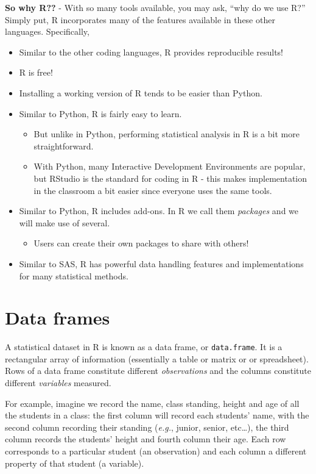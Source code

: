 \documentclass[
]{book}
\providecommand{\tightlist}{%
  \setlength{\itemsep}{0pt}\setlength{\parskip}{0pt}}
\begin{document}
\textbf{So why R??} - With so many tools available, you may ask, ``why do we use R?'' Simply put, R incorporates many of the features available in these other languages. Specifically,

\begin{itemize}
\tightlist
\item
  Similar to the other coding languages, R provides reproducible results!
\item
  R is free!
\item
  Installing a working version of R tends to be easier than Python.
\item
  Similar to Python, R is fairly easy to learn.

  \begin{itemize}
  \tightlist
  \item
    But unlike in Python, performing statistical analysis in R is a bit more straightforward.
  \item
    With Python, many Interactive Development Environments are popular, but RStudio is the standard for coding in R - this makes implementation in the classroom a bit easier since everyone uses the same tools.
  \end{itemize}
\item
  Similar to Python, R includes add-ons. In R we call them \emph{packages} and we will make use of several.

  \begin{itemize}
  \tightlist
  \item
    Users can create their own packages to share with others!
  \end{itemize}
\item
  Similar to SAS, R has powerful data handling features and implementations for many statistical methods.
\end{itemize}

\hypertarget{data-frames}{%
\section{Data frames}\label{data-frames}}

A statistical dataset in R is known as a data frame, or \texttt{data.frame}.
It is a rectangular array of information (essentially a table or matrix or or spreadsheet). Rows of a data frame constitute different \emph{observations} and the columns constitute different \emph{variables} measured.

For example, imagine we record the name, class standing, height and age of all the students in a class: the first column will record each students' name, with the second column recording their standing (\emph{e.g.}, junior, senior, etc\ldots), the third column records the students' height and fourth column their age. Each row corresponds to a particular student (an observation) and each column a different property of that student (a variable).
\end{document}

